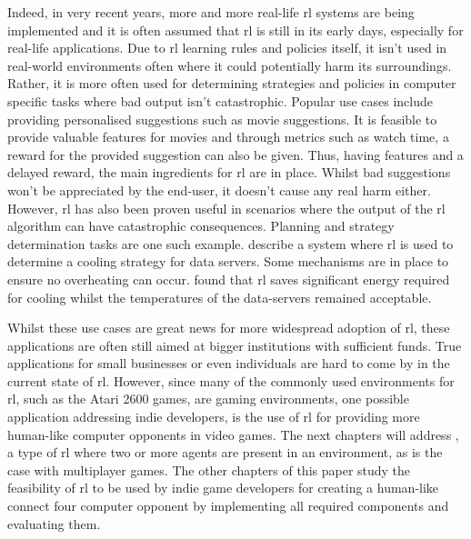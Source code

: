 Indeed, in very recent years, more and more real-life \gls{rl} systems are being implemented and it is often assumed that \gls{rl} is still in its early days, especially for real-life applications.
Due to \gls{rl} learning rules and policies itself, it isn't used in real-world environments often where it could potentially harm its surroundings.
Rather, it is more often used for determining strategies and policies in computer specific tasks where bad output isn't catastrophic.
Popular use cases include providing personalised suggestions such as movie suggestions.
It is feasible to provide valuable features for movies and through metrics such as watch time, a reward for the provided suggestion can also be given.
Thus, having features and a delayed reward, the main ingredients for \gls{rl} are in place.
Whilst bad suggestions won't be appreciated by the end-user, it doesn't cause any real harm either.
However, \Gls{rl} has also been proven useful in scenarios where the output of the \gls{rl} algorithm can have catastrophic consequences.
Planning and strategy determination tasks are one such example.
 describe a system where \gls{rl} is used to determine a cooling strategy for data servers.
Some mechanisms are in place to ensure no overheating can occur.
 found that \gls{rl} saves significant energy required for cooling whilst the temperatures of the data-servers remained acceptable. 

Whilst these use cases are great news for more widespread adoption of \gls{rl}, these applications are often still aimed at bigger institutions with sufficient funds.
True applications for small businesses or even individuals are hard to come by in the current state of \gls{rl}.
However, since many of the commonly used environments for \gls{rl}, such as the Atari 2600 games, are gaming environments, one possible application addressing indie developers, is the use of \gls{rl} for providing more human-like computer opponents in video games.
The next chapters will address , a type of  \gls{rl} where two or more agents are present in an environment, as is the case with multiplayer games. The other chapters of this paper study the feasibility of \gls{rl} to be used by indie game developers for creating a human-like connect four computer opponent by implementing all required components and evaluating them. 
